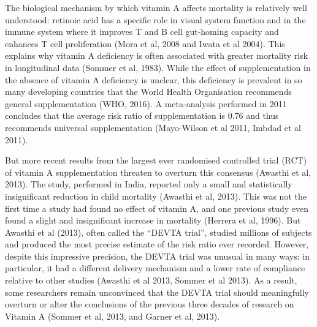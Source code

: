 \documentclass[12pt]{article}
\begin{document}

The biological mechanism by which vitamin A affects mortality is relatively well understood: retinoic acid has a specific role in visual system function and in the immune system where it improves T and B cell gut-homing capacity and enhances T cell proliferation (Mora et al, 2008 and Iwata et al 2004). This explains why vitamin A deficiency is often associated with greater mortality risk in longitudinal data (Sommer et al, 1983). While the effect of supplementation in the absence of vitamin A deficiency is unclear, this deficiency is prevalent in so many developing countries that the World Health Organisation recommends general supplementation (WHO, 2016). 
A meta-analysis performed in 2011 concludes that the average risk ratio of supplementation is 0.76 and thus recommends universal supplementation (Mayo-Wilson et al 2011, Imbdad et al 2011). 

But more recent results from the largest ever randomised controlled trial (RCT) of vitamin A supplementation threaten to overturn this consensus (Awasthi et al, 2013). The study, performed in India, reported only a small and statistically insignificant reduction in child mortality (Awasthi et al, 2013). This was not the first time a study had found no effect of vitamin A, and one previous study even found a slight and insignificant increase in mortality (Herrera et al, 1996). But Awasthi et al (2013), often called the ``DEVTA trial'', studied millions of subjects and produced the most precise estimate of the risk ratio ever recorded. However, despite this impressive precision, the DEVTA trial was unusual in many ways: in particular, it had a different delivery mechanism and a lower rate of compliance relative to other studies (Awasthi et al 2013, Sommer et al 2013). As a result, some researchers remain unconvinced that the DEVTA trial should meaningfully overturn or alter the conclusions of the previous three decades of research on Vitamin A (Sommer et al, 2013, and Garner et al, 2013).
\end{document}
